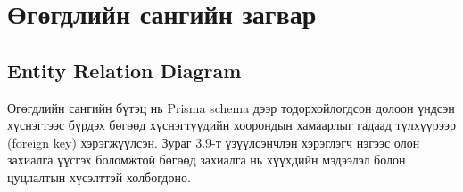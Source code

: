 

\section{Өгөгдлийн сангийн загвар}
\subsection{Entity Relation Diagram}

Өгөгдлийн сангийн бүтэц нь Prisma schema дээр тодорхойлогдсон долоон үндсэн хүснэгтээс бүрдэх бөгөөд хүснэгтүүдийн хоорондын хамаарлыг гадаад түлхүүрээр (foreign key) хэрэгжүүлсэн. Зураг 3.9-т үзүүлсэнчлэн хэрэглэгч нэгээс олон захиалга үүсгэх боломжтой бөгөөд захиалга нь хүүхдийн мэдээлэл болон цуцлалтын хүсэлттэй холбогдоно.

